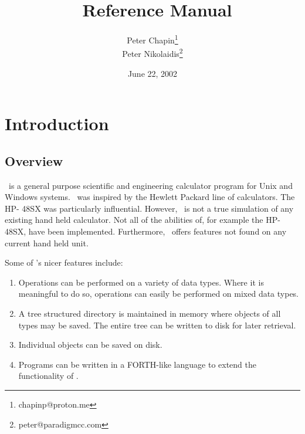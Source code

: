 \documentclass{report}
\begin{document}
\title{\CLAC\ Reference Manual}
\author{Peter Chapin\thanks{chapinp@proton.me}\\
        Peter Nikolaidis\thanks{peter@paradigmcc.com}}
\date{June 22, 2002}
\maketitle

\tableofcontents
\newpage
{}

\chapter{Introduction}

\section{Overview}

\CLAC\ is a general purpose scientific and engineering calculator program for Unix and Windows
systems. \CLAC\ was inspired by the Hewlett Packard line of calculators. The HP- 48SX was
particularly influential. However, \CLAC\ is not a true simulation of any existing hand held
calculator. Not all of the abilities of, for example the HP-48SX, have been implemented.
Furthermore, \CLAC\ offers features not found on any current hand held unit.

Some of \CLAC's nicer features include:

\begin{enumerate}
  
\item Operations can be performed on a variety of data types. Where it is meaningful to do so,
  operations can easily be performed on mixed data types.
  
\item A tree structured directory is maintained in memory where objects of all types may be
  saved. The entire tree can be written to disk for later retrieval.

\item Individual objects can be saved on disk.
  
\item Programs can be written in a FORTH-like language to extend the functionality of \CLAC.

\end{enumerate}
\end{document}
